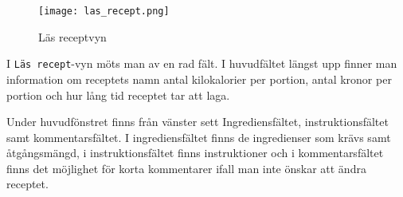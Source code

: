 \begin{figure}[H]
        \centering 
        \texttt{[image: las\_recept.png]} 
        \caption{Läs receptvyn} 
        \label{fig:receptvyn}
\end{figure}

I \verb+Läs recept+-vyn möts man av en rad fält. I huvudfältet längst upp finner
man information om receptets namn antal kilokalorier per portion,
antal kronor per portion och hur lång tid receptet tar att laga.

Under huvudfönstret finns från vänster sett Ingrediensfältet,
instruktionsfältet samt kommentarsfältet. I ingrediensfältet finns de
ingredienser som krävs samt åtgångsmängd, i instruktionsfältet finns
instruktioner och i kommentarsfältet finns det möjlighet för korta
kommentarer ifall man inte önskar att ändra receptet.
